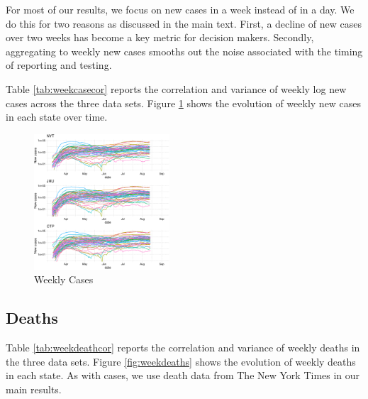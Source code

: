 \documentclass[11pt,reqno,letter]{amsart}
\theoremstyle{definition}
\begin{document}


For most of our results, we focus on new cases in a week instead of in
a day. We do this for two reasons as discussed in the main text. First, a decline of new cases over
two weeks has become a key metric for decision makers. Secondly, aggregating to weekly new cases smooths out the noise associated with  the timing of
reporting and testing.

Table \ref{tab:weekcasecor} reports the correlation and variance of
weekly log new cases across the three data sets. Figure
\ref{fig:weekcases} shows the evolution of weekly new cases in each
state over time.



\begin{figure}[!ht]\caption{Weekly Cases \label{fig:weekcases}}
  \centering
  \begin{minipage}{\textwidth}
    \centering
    \includegraphics[width=0.45\textwidth]{tables_and_figures/weekcases}
  \end{minipage}
\end{figure}

\subsection{Deaths}

Table \ref{tab:weekdeathcor} reports the correlation and variance of
weekly deaths in the three data sets. Figure \ref{fig:weekdeaths}
shows the evolution of weekly deaths in each state. As with cases, we
use death data from The New York Times in our main results.


\end{document}
